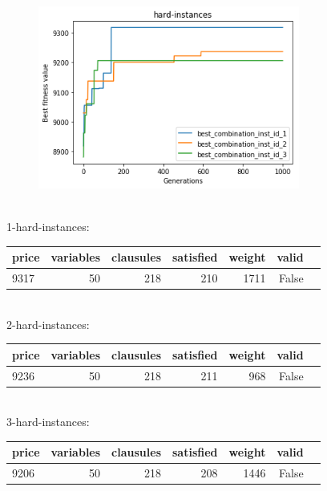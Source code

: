 \documentclass[a4paper,10pt,twocolumn]{article}
\begin{document}
\begin{itemize}
\begin{itemize}
\begin{figure}[H]
  \begin{center}
    \includegraphics[height=6cm]{graphs/hard-instances.png}
  \end{center}
\end{figure}





\\
1-hard-instances:
\\




\begin{tabular}{lrrrrrl}
\toprule
        price &  variables &  clausules &  satisfied &  weight &  valid \\
\midrule
 9317 &         50 &        218 &        210 &    1711 &  False \\
\bottomrule
\end{tabular}





\\
2-hard-instances:
\\


\begin{tabular}{lrrrrrl}
\toprule
        price &  variables &  clausules &  satisfied &  weight &  valid \\
\midrule
  9236 &         50 &        218 &        211 &     968 &  False \\
\bottomrule
\end{tabular}






\\
3-hard-instances:
\\



\begin{tabular}{lrrrrrl}
\toprule
        price &  variables &  clausules &  satisfied &  weight &  valid \\
\midrule
  9206 &         50 &        218 &        208 &    1446 &  False \\
\bottomrule
\end{tabular}


\end{itemize}
\end{itemize}
\end{document}
